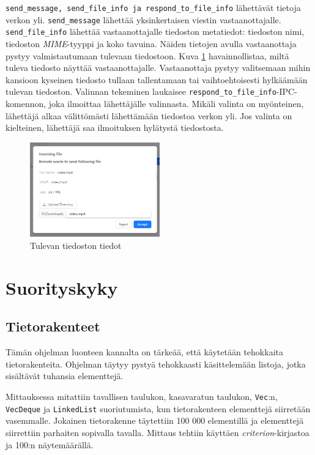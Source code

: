 \documentclass[a4paper,12pt]{article}
\begin{document}
    \lstinline{send_message, send_file_info ja respond_to_file_info} lähettävät tietoja verkon yli. \lstinline{send_message} lähettää yksinkertaisen viestin vastaanottajalle.
    \lstinline{send_file_info} lähettää vastaanottajalle tiedoston metatiedot: tiedoston nimi, tiedoston \textit{MIME}-tyyppi ja koko tavuina. Näiden tietojen avulla vastaanottaja pystyy valmistautumaan tulevaan tiedostoon. Kuva \ref{fig:incoming_file} havainnollistaa, miltä tuleva tiedosto näyttää vastaanottajalle. Vastaanottaja pystyy valitsemaan mihin kansioon kyseinen tiedosto tullaan tallentamaan tai vaihtoehtoisesti hylkäämään tulevan tiedoston. Valinnan tekeminen laukaisee \lstinline{respond_to_file_info}-IPC-komennon, joka ilmoittaa lähettäjälle valinnasta.
    Mikäli valinta on myönteinen, lähettäjä alkaa välittömästi lähettämään tiedostoa verkon yli. Jos valinta on kielteinen, lähettäjä saa ilmoituksen hylätystä tiedostosta.

    \begin{figure}[h!]
        \centering
        \includegraphics[width=0.5\textwidth]{doc/latex/src/images/incoming_file.png}
        \caption{Tulevan tiedoston tiedot}
        \label{fig:incoming_file}
    \end{figure}

    \section{Suorityskyky}\label{sec:suorityskyky}

    \subsection{Tietorakenteet}\label{sec:structures}
    Tämän ohjelman luonteen kannalta on tärkeää, että käytetään tehokkaita tietorakenteita. Ohjelman täytyy pystyä tehokkaasti käsittelemään listoja, jotka sisältävät tuhansia elementtejä. \par
    Mittauksessa mitattiin tavallisen taulukon, kasavaratun taulukon,
    \lstinline{Vec}:n, \lstinline{VecDeque} ja \lstinline{LinkedList} suoriutumista, kun tietorakenteen elementtejä siirretään vasemmalle. Jokainen tietorakenne täytettiin 100 000 elementillä ja elementtejä siirrettiin parhaiten sopivalla tavalla.
    Mittaus tehtiin käyttäen \textit{criterion}-kirjastoa ja 100:n näytemäärällä.
\end{document}
